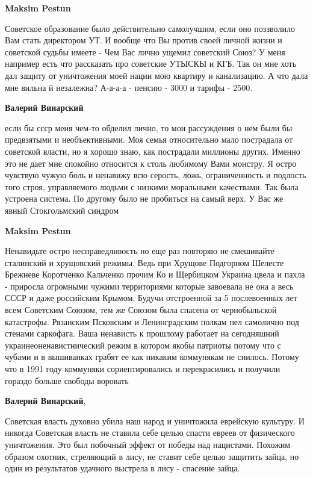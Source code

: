 \begin{itemize}
\begin{itemize} %
\textbf{Maksim Pestun} 

Советское образование было действительно самолучшим, если оно поззволило Вам
стать директором УТ. И вообще что Вы против своей личной жизни и советской
судьбы имеете - Чем Вас лично ущемил советский Союз? У меня например есть что
рассказать про советские УТЫСКЫ и КГБ. Так он мне хоть дал защиту от
уничтожения моей нации мою квартиру и канализацию. А что дала мне вильна й
незалежна? А-а-а-а - пенсию - 3000 и тарифы - 2500.

\begin{itemize} %
\textbf{Валерий Винарский} 

если бы ссср меня чем-то обделил лично, то мои рассуждения о нем были бы
предвзятыми и необъективными. Моя семья относительно мало пострадала от
советской власти, но я хорошо знаю, как пострадали миллионы других. Именно это
не дает мне спокойно относится к столь любимому Вами монстру. Я остро чувствую
чужую боль и ненавижу всю серость, ложь, ограниченность и подлость того строя,
управляемого людьми с низкими моральными качествами. Так была устроена система.
По другому было не пробиться на самый верх. У Вас же явный Стокгольмский
синдром

\textbf{Maksim Pestun} 

Ненавидьте остро несправедливость но еще раз повторяю не смешивайте сталинский
и хрущовский режимы. Ведь при Хрущове Подгорном Шелесте Брежневе Коротченко
Кальченко прочим Ко и Щербицком Украина цвела и пахла - приросла огромными
чужими территориями которые завоевала не она а весь СССР и даже российским
Крымом. Будучи отстроенной за 5 послевоенных лет всем Советским Союзом, тем же
Союзом была спасена от чернобыльской катастрофы. Рязанским Псковским и
Ленинградским полкам пел самолично под стенами саркофага. Ваша ненависть к
прошлому работает на сегодняшний украинеоненавистнический режим в котором якобы
патриоты потому что с чубами и в вышиванках грабят ее как никаким коммунякам не
снилось. Потому что в 1991 году коммуняки сориентировались и перекрасились и
получили гораздо больше свободы воровать

\textbf{Валерий Винарский}, 

Советская власть духовно убила наш народ и уничтожила еврейскую культуру. И
никогда Советская власть не ставила себе целью спасти евреев от физического
уничтожения. Это был побочный эффект от победы над нацистами. Похожим образом
охотник, стреляющий в лису, не ставит себе целью защитить зайца, но один из
результатов удачного выстрела в лису - спасение зайца.


\end{itemize}
\end{itemize}
\end{itemize}
